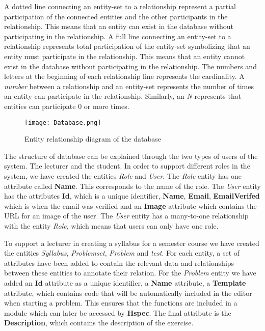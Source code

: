 A dotted line connecting an entity-set to a relationship represent a partial participation of the connected entities and the other participants in the relationship. This means that an entity can exist in the database without participating in the relationship.
A full line connecting an entity-set to a relationship represents total participation of the entity-set symbolizing that an entity must participate in the relationship.
This means that an entity cannot exist in the database without participating in the relationship.
The numbers and letters at the beginning of each relationship line represents the cardinality. A \textit{number} between a relationship and an entity-set represents the number of times an entity can participate in the relationship. Similarly, an \textit{N} represents that entities can participate $0$ or more times.

\begin{figure}[H]
	\texttt{[image: Database.png]}
	\centering
	\caption{Entity relationship diagram of the database}
	\label{fig:Database}
\end{figure}

The structure of database can be explained through the two types of users of the system. The lecturer and the student.
In order to support different roles in the system, we have created the entities \textit{Role} and \textit{User}. The \textit{Role} entity has one attribute called \textbf{Name}. This corresponds to the name of the role. The \textit{User} entity has the attributes \textbf{Id}, which is a unique identifier, \textbf{Name}, \textbf{Email}, \textbf{EmailVerifed} which is when the email was verified and an \textbf{Image} attribute which contains the URL for an image of the user. The \textit{User} entity has a many-to-one relationship with the entity \textit{Role}, which means that users can only have one role.

To support a lecturer in creating a syllabus for a semester course we have created the entities \textit{Syllabus}, \textit{Problemset}, \textit{Problem} and \textit{test}. For each entity, a set of attributes have been added to contain the relevant data and relationships between these entities to annotate their relation.
For the \textit{Problem} entity we have added an \textbf{Id} attribute as a unique identifier, a \textbf{Name} attribute, a \textbf{Template} attribute, which contains code that will be automatically included in the editor when starting a problem. This ensures that the functions are included in a module which can later be accessed by \textbf{Hspec}. The final attribute is the \textbf{Description}, which contains the description of the exercise.

